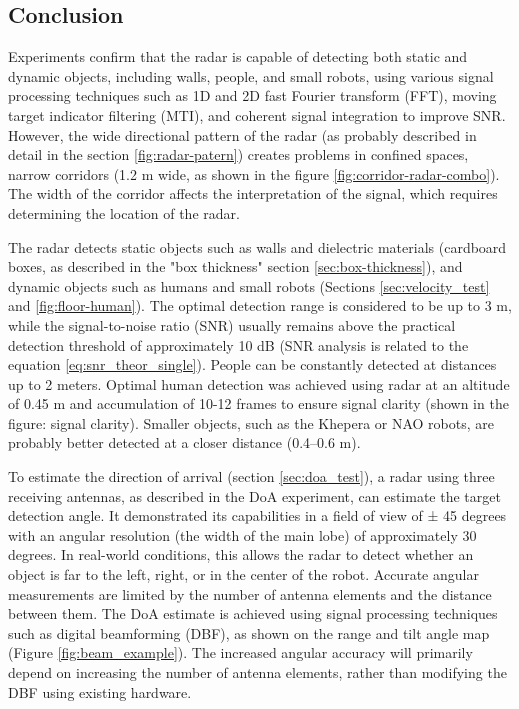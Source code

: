 \subsection{Conclusion}



Experiments confirm that the radar is capable of detecting both static and dynamic objects, including walls, people, and small robots, using various signal processing techniques such as 1D and 2D fast Fourier transform (FFT), moving target indicator filtering (MTI), and coherent signal integration to improve SNR. However, the wide directional pattern of the radar (as probably described in detail in the section  \ref{fig:radar-patern}) creates problems in confined spaces, narrow corridors (1.2 m wide, as shown in the figure \ref{fig:corridor-radar-combo}). The width of the corridor affects the interpretation of the signal, which requires determining the location of the radar.

The radar detects static objects such as walls and dielectric materials (cardboard boxes, as described in the "box thickness" section \ref{sec:box-thickness}), and dynamic objects such as humans and small robots (Sections \ref{sec:velocity_test} and \ref{fig:floor-human}). The optimal detection range is considered to be up to 3 m, while the signal-to-noise ratio (SNR) usually remains above the practical detection threshold of approximately 10 dB (SNR analysis is related to the equation \ref{eq:snr_theor_single}). People can be constantly detected at distances up to 2 meters. Optimal human detection was achieved using radar at an altitude of 0.45 m and accumulation of 10-12 frames to ensure signal clarity (shown in the figure: signal clarity). Smaller objects, such as the Khepera or NAO robots, are probably better detected at a closer distance (0.4–0.6 m).

To estimate the direction of arrival (section \ref{sec:doa_test}), a radar using three receiving antennas, as described in the DoA experiment, can estimate the target detection angle. It demonstrated its capabilities in a field of view of ± 45 degrees with an angular resolution (the width of the main lobe) of approximately 30 degrees. In real-world conditions, this allows the radar to detect whether an object is far to the left, right, or in the center of the robot. Accurate angular measurements are limited by the number of antenna elements and the distance between them. The DoA estimate is achieved using signal processing techniques such as digital beamforming (DBF), as shown on the range and tilt angle map (Figure \ref{fig:beam_example}). The increased angular accuracy will primarily depend on increasing the number of antenna elements, rather than modifying the DBF using existing hardware.

